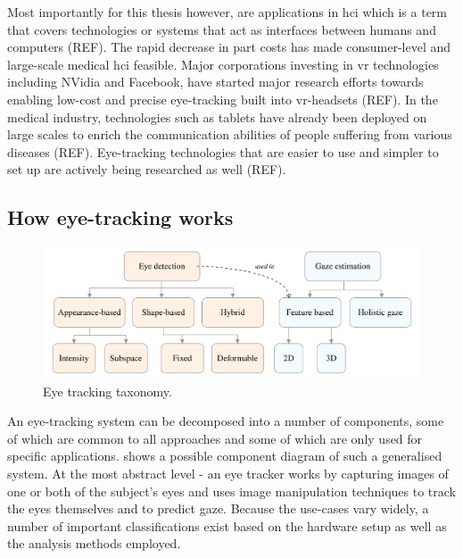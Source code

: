 Most importantly for this thesis however, are applications in \acrfull{hci} which is a term that covers technologies or systems that act as interfaces between humans and computers (REF). The rapid decrease in part costs has made consumer-level and large-scale medical \acrlong{hci} feasible. Major corporations investing in \acrfull{vr} technologies including NVidia and Facebook, have started major research efforts towards enabling low-cost and precise eye-tracking built into \acrshort{vr}-headsets (REF). In the medical industry, technologies such as tablets have already been deployed on large scales to enrich the communication abilities of people suffering from various diseases (REF). Eye-tracking technologies that are easier to use and simpler to set up are actively being researched as well (REF). 

\subsection{How eye-tracking works}
\begin{figure}
	\includegraphics[width=1\textwidth]{figures/model/taxonomy}
	\caption{Eye tracking taxonomy.}\label{fig:taxonomy}
\end{figure}
An eye-tracking system can be decomposed into a number of components, some of which are common to all approaches and some of which are only used for specific applications.  shows a possible component diagram of such a generalised system. At the most abstract level - an eye tracker works by capturing images of one or both of the subject's eyes and uses image manipulation techniques to track the eyes themselves and to predict gaze. Because the use-cases vary widely, a number of important classifications exist based on the hardware setup as well as the analysis methods employed.

